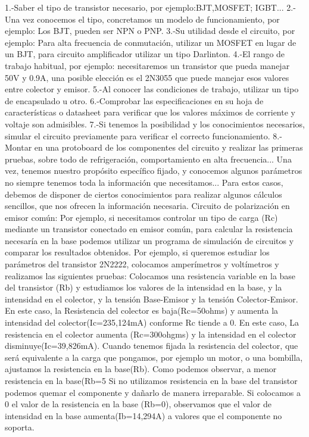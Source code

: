 \documentclass[11pt,a4paper]{article}
\begin{document}
1.-Saber el tipo de transistor necesario, por ejemplo:BJT,MOSFET; IGBT...
2.-Una vez conocemos el tipo, concretamos un modelo de funcionamiento, por ejemplo: Los BJT, pueden ser NPN o PNP.
3.-Su utilidad desde el circuito, por ejemplo: Para alta frecuencia de conmutación, utilizar un MOSFET en lugar de un BJT, para circuito amplificador utilizar un tipo Darlinton.
4.-El rango de trabajo habitual, por ejemplo: necesitaremos un transistor que pueda manejar 50V y 0.9A, una posible elección es el 2N3055 que puede manejar esos valores entre colector y emisor.
5.-Al conocer las condiciones de trabajo, utilizar un tipo de encapsulado u otro.
6.-Comprobar las especificaciones en su hoja de características o datasheet para verificar que los valores máximos de corriente y voltaje son admisibles.
7.-Si tenemos la posibilidad y los conocimientos necesarios, simular el circuito  previamente para verificar el correcto funcionamiento.
8.-Montar en una protoboard de los componentes del circuito y realizar las primeras pruebas, sobre todo de refrigeración, comportamiento en alta frecuencia...
Una vez, tenemos nuestro propósito específico fijado, y conocemos algunos parámetros no siempre tenemos toda la información que necesitamos...
Para estos casos, debemos de disponer de ciertos conocimientos para realizar algunos cálculos sencillos, que nos ofrecen la información necesaria.
Circuito de polarización en emisor común:
Por ejemplo, si necesitamos controlar un tipo de carga (Rc) mediante un transistor conectado en emisor común, para calcular la resistencia necesaría en la base podemos utilizar un programa de simulación de circuitos y comparar los resultados obtenidos.
Por ejemplo, si queremos estudiar los parámetros del transistor 2N2222, colocamos amperímetros y voltímetros y realizamos las siguientes pruebas:
Colocamos una resistencia variable en la base del transistor (Rb) y estudiamos los valores de la intensidad en la base, y la intensidad en el colector, y la tensión Base-Emisor y la tensión Colector-Emisor.  
En este caso, la Resistencia del colector es baja(Rc=50ohms) y aumenta la intensidad del colector(Ic=235,124mA) conforme Rc tiende a 0.
En este caso, La resistencia en el colector aumenta (Rc=300ohgms) y la intensidad en el colector disminuye(Ic=39,826mA).
Cuando tenemos fijada la resistencia del colector, que será equivalente a la carga que pongamos, por ejemplo un motor, o una bombilla, ajustamos la resistencia en la base(Rb).
Como podemos observar, a menor resistencia en la base(Rb=5%
Si no utilizamos resistencia en la base del transistor podemos quemar el componente y dañarlo de manera irreparable. Si colocamos a 0 el valor de la resistencia en la base (Rb=0), observamos que el valor de intensidad en la base aumenta(Ib=14,294A) a valores que el componente no soporta.
\end{document}
